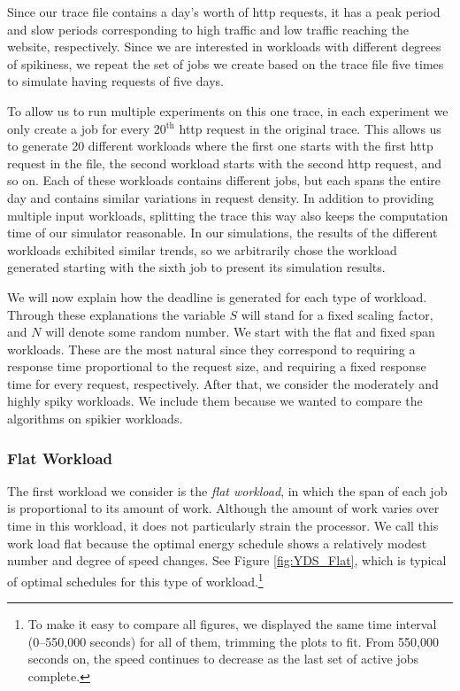\documentclass[11pt]{article}
\begin{document}
Since our trace file contains a day's worth of http requests, it has a
peak period and slow periods corresponding to high traffic and low
traffic reaching the website, respectively.
Since we are
interested in workloads with different degrees of spikiness, we repeat
the set of jobs we create based on the trace file five times to
simulate having requests of five days.

To allow us to run multiple experiments on this one trace, in each
experiment we only create a job for every 20$^{\textrm{th}}$ http
request in the original trace. This allows us to generate 20 different
workloads where the first one starts with the first http request in
the file, the second workload starts with the second http request, and
so on. 
Each of these workloads contains different jobs, but each spans the
entire day and contains similar variations in request density.
In addition to providing multiple input workloads, splitting the trace
this way also keeps the computation time of our simulator reasonable. In our simulations, the results of the different workloads exhibited similar trends, so we arbitrarily chose the workload generated starting with the sixth job to present its simulation results.


We will now explain how the deadline is generated for each type of
workload. Through these explanations the variable $S$ will stand
for a fixed scaling factor, and $N$ will denote some random number.
We start with the flat and fixed span workloads. These
are the most natural since they correspond to requiring
a response time proportional to the request size, and requiring a fixed
response time for every request, respectively. After that, we
consider the moderately and highly spiky workloads. We include them
because we wanted to compare the algorithms on spikier workloads.


\subsubsection{Flat Workload}
The first workload we consider is the {\em flat workload}, in which
the span of each job is proportional to its amount of work.
Although the amount of work varies over time in this workload, it 
does not particularly strain the processor.
We call this work load flat because the optimal energy schedule shows
a relatively modest number and degree of speed changes.
See Figure \ref{fig:YDS_Flat}, which is typical of optimal schedules for
this type of workload.\footnote{To make it easy to compare all
  figures, we displayed the same time interval (0--550,000 seconds)
  for all of them, trimming the plots to fit.
  From 550,000 seconds on, the speed continues to decrease as the
  last set of active jobs complete.}
\end{document}
